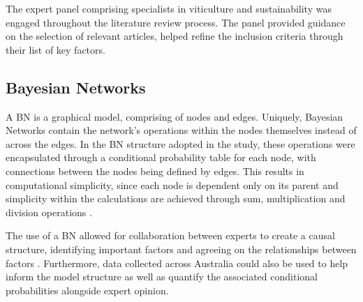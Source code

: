 \documentclass[fleqn,10pt]{wlscirep}
\begin{document}
The expert panel comprising specialists in viticulture and sustainability was engaged throughout the literature review process. The panel provided guidance on the selection of relevant articles, helped refine the inclusion criteria through their list of key factors.

\subsection{Bayesian Networks}

A BN is a graphical model, comprising of nodes and edges. Uniquely, Bayesian Networks contain the network's operations within the nodes themselves instead of across the edges. In the BN structure adopted in the study, these operations were encapsulated through a conditional probability table for each node, with connections between the nodes being defined by edges. This results in computational simplicity, since each node is dependent only on its parent and simplicity within the calculations are achieved through sum, multiplication and division operations
.

The use of a BN allowed for collaboration between experts to create a causal structure, identifying important factors and agreeing on the relationships between factors
. Furthermore, data collected across Australia could also be used to help inform the model structure as well as quantify the associated conditional probabilities alongside expert opinion.
\end{document}
